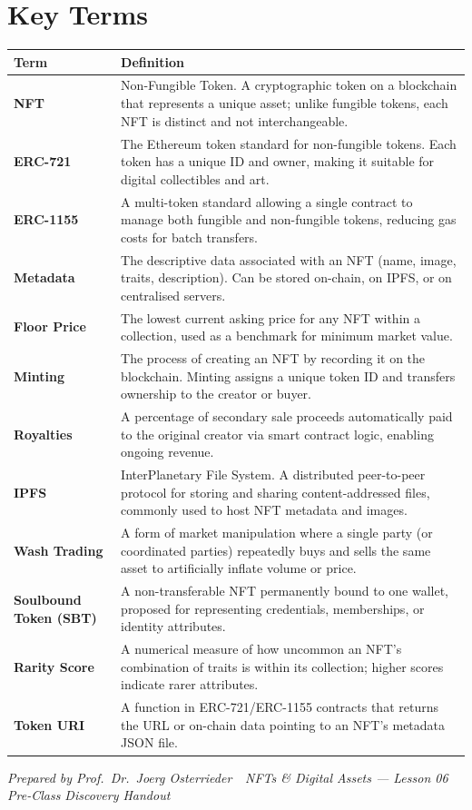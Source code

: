 \documentclass[11pt,a4paper]{article}
\begin{document}
\vspace{4pt}

\section{Key Terms}

\renewcommand{\arraystretch}{1.25}
\noindent\begin{tabular}{@{}p{3.2cm}p{11.4cm}@{}}
\toprule
\textbf{Term} & \textbf{Definition} \\
\midrule
\textbf{NFT}                  & Non-Fungible Token. A cryptographic token on a blockchain that represents a unique asset; unlike fungible tokens, each NFT is distinct and not interchangeable. \\
\textbf{ERC-721}              & The Ethereum token standard for non-fungible tokens. Each token has a unique ID and owner, making it suitable for digital collectibles and art. \\
\textbf{ERC-1155}             & A multi-token standard allowing a single contract to manage both fungible and non-fungible tokens, reducing gas costs for batch transfers. \\
\textbf{Metadata}             & The descriptive data associated with an NFT (name, image, traits, description). Can be stored on-chain, on IPFS, or on centralised servers. \\
\textbf{Floor Price}          & The lowest current asking price for any NFT within a collection, used as a benchmark for minimum market value. \\
\textbf{Minting}              & The process of creating an NFT by recording it on the blockchain. Minting assigns a unique token ID and transfers ownership to the creator or buyer. \\
\textbf{Royalties}            & A percentage of secondary sale proceeds automatically paid to the original creator via smart contract logic, enabling ongoing revenue. \\
\textbf{IPFS}                 & InterPlanetary File System. A distributed peer-to-peer protocol for storing and sharing content-addressed files, commonly used to host NFT metadata and images. \\
\textbf{Wash Trading}         & A form of market manipulation where a single party (or coordinated parties) repeatedly buys and sells the same asset to artificially inflate volume or price. \\
\textbf{Soulbound Token (SBT)} & A non-transferable NFT permanently bound to one wallet, proposed for representing credentials, memberships, or identity attributes. \\
\textbf{Rarity Score}         & A numerical measure of how uncommon an NFT's combination of traits is within its collection; higher scores indicate rarer attributes. \\
\textbf{Token URI}            & A function in ERC-721/ERC-1155 contracts that returns the URL or on-chain data pointing to an NFT's metadata JSON file. \\
\bottomrule
\end{tabular}

\vspace{6pt}
\noindent\textcolor{mlgray}{\small\textit{Prepared by Prof.\ Dr.\ Joerg Osterrieder \,\textbullet\, NFTs \& Digital Assets --- Lesson 06 \,\textbullet\, Pre-Class Discovery Handout}}
\end{document}
